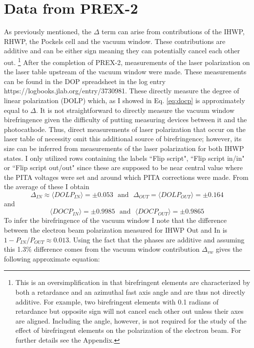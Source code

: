 \documentclass[12pt]{article}
\begin{document}
\section{Data from PREX-2}
As previously mentioned, the $\Delta$ term can arise from contributions of the IHWP, RHWP, the Pockels cell and the vacuum window. These contributions are additive and can be either sign meaning they can potentially cancel each other out. \footnote{This is an oversimplification in that birefringent elements are characterized by both a retardance and an azimuthal fast axis angle and are thus not directly additive. For example, two birefringent elements with 0.1 radians of retardance but opposite sign will not cancel each other out unless their axes are aligned. Including the angle, however, is not required for the study of the effect of birefringent elements on the polarization of the electron beam. For further details see the Appendix.} After the completion of PREX-2, measurements of the laser polarization on the laser table upstream of the vacuum window were made. These measurements can be found in the DOP spreadsheet in the log entry  https://logbooks.jlab.org/entry/3730981. These directly measure the degree of linear polarization (DOLP) which, as I showed in Eq. \ref{eq:docp} is approximately equal to $\Delta$. It is not straightforward to directly measure the vacuum window birefringence given the difficulty of putting measuring devices between it and the photocathode. Thus, direct measurements of laser polarization that occur on the laser table of necessity omit this additional source of birefringence; however, its size can be inferred from measurements of the laser polarization for both IHWP states. I only utilized rows containing the labels ``Flip script", ``Flip script in/in" or ``Flip script out/out" since these are supposed to be near central value where the PITA voltages were set and around which PITA corrections were made. From the average of these I obtain
\begin{equation}
\Delta_{IN}\approx\langle DOLP_{IN} \rangle=\pm0.053 ~~~ \textrm{and}~~~ \Delta_{OUT}=\langle DOLP_{OUT} \rangle=\pm0.164
\label{eq:docp_in}
\end{equation}
and
\begin{equation}
\label{eq:docp_out}
\langle DOCP_{IN} \rangle=\pm0.9985 ~~~ \textrm{and}~~~ \langle DOCP_{OUT} \rangle=\pm0.9865
\end{equation}
To infer the birefringence of the vacuum window I note that the difference between the electron beam polarization measured for IHWP Out and In is $1-P_{IN}/P_{OUT}\approx 0.013.$ Using the fact that the phases are additive and assuming this 1.3\% difference comes from the vacuum window contribution $\Delta_{vw}$ gives the following approximate equation:
\end{document}

